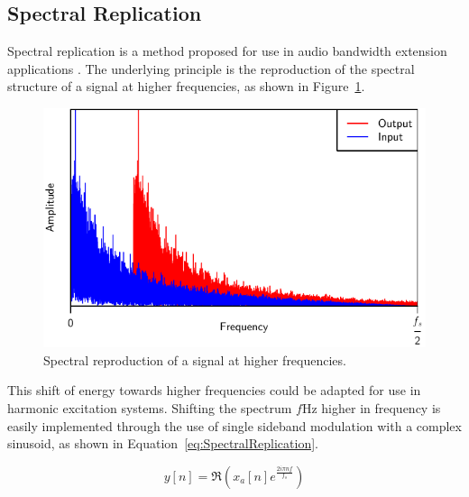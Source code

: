 	\subsection{Spectral Replication}
	\label{sec:Excitation-Methods-SpectralReplication}
		Spectral replication is a method proposed for use in audio bandwidth extension applications
		\citep{nagel2010a}. The underlying principle is the reproduction of the spectral structure of a signal at
		higher frequencies, as shown in Figure~\ref{fig:SpectralReplication}.

		\begin{figure}[h!]
			\centering
			\includegraphics{chapter3/Images/SpectralReplicationSpectrum.pdf}
			\caption{Spectral reproduction of a signal at higher frequencies.}
			\label{fig:SpectralReplication}
		\end{figure}

		This shift of energy towards higher frequencies could be adapted for use in harmonic excitation systems.
		Shifting the spectrum $f$Hz higher in frequency is easily implemented through the use of single sideband
		modulation with a complex sinusoid, as shown in Equation~\ref{eq:SpectralReplication}.

		\begin{equation}
			y[n] = \Re \left( x_{a}[n] e^{\frac{2i\pi nf}{f_{s}}} \right)
			\label{eq:SpectralReplication}
		\end{equation}

